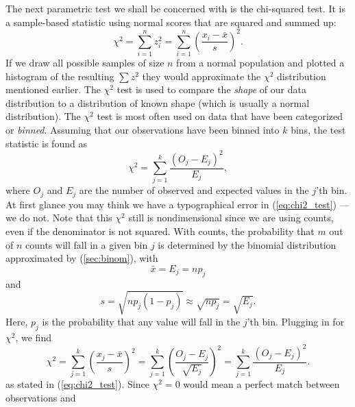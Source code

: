 	The next parametric test we shall be concerned with is the chi-squared test.  It is a sample-based
statistic using normal scores that are squared and summed up:
\begin{equation}
\chi^2=\sum^n_{i=1}z_i^2=\sum^n_{i=1}\left(\frac{x_i-\bar{x}}{s}\right)^2.
\label{eq:ch:2_test}
\end{equation}
If we draw all possible samples of size $n$ from a normal population and plotted a histogram of the resulting $\sum z^2$ they would 
approximate the $\chi^2$ distribution mentioned earlier.  The $\chi^2$ test is used to compare the \emph{shape} of our data 
distribution to a distribution of known shape (which is usually a normal distribution).
	The $\chi^2$ test is most often used on data that have been categorized or \emph{binned}.  Assuming that 
our observations have been binned into $k$ bins, the test statistic is found as 
\begin{equation}
\chi^2=\sum^k_{j=1}\frac{(O_j-E_j)^2}{E_j},
\label{eq:chi2_test}
\end{equation}
where $O_j$ and $E_j$ are the number of observed and expected values in the $j$'th bin.  At first glance
you may think we have a typographical error in (\ref{eq:chi2_test}) --- we do not.  Note that this $\chi^2$ 
still is nondimensional since we are using counts, even if the denominator is not squared.  With 
counts, the probability that $m$ out of $n$ counts will fall in a given bin $j$ is determined by the 
binomial distribution approximated by (\ref{sec:binom}), with
\begin{equation}
\bar{x} = E_j = np_j
\end{equation}
and
\begin{equation}
s = \sqrt{np_j (1- p_j)} \approx \sqrt{np_j} = \sqrt{E_j}. 
\end{equation} 	
Here, $p_j$ is the probability that any value will fall in the $j$'th bin.  Plugging in for $\chi^2$, we find
\begin{equation}
\chi^2 = \sum^k_{j=1} \left ( \frac{x_j - \bar{x}}{s} \right) ^2 =
\sum^k_{j=1} \left( \frac{O_j - E_j}{\sqrt{E_j}} \right) ^2 = \sum^k_{j=1}
\frac{(O_j - E_j)^2}{E_j}.	 
\end{equation}
as stated in (\ref{eq:chi2_test}).  Since $\chi^2 = 0$ would mean a perfect match between observations and
